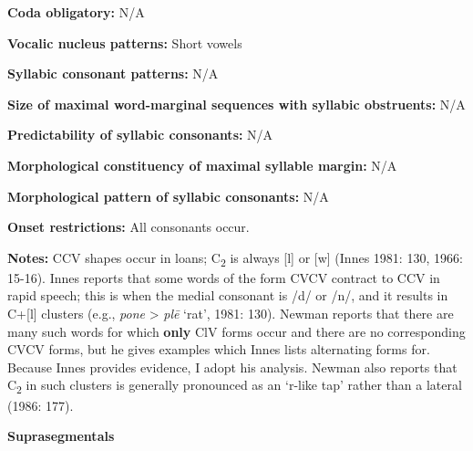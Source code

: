 \begin{styleBody}
\textbf{Coda obligatory:} N/A
\end{styleBody}

\begin{styleBody}
\textbf{Vocalic nucleus patterns:} Short vowels
\end{styleBody}

\begin{styleBody}
\textbf{Syllabic consonant patterns:} N/A
\end{styleBody}

\begin{styleBody}
\textbf{Size of maximal word{}-marginal sequences with syllabic obstruents:} N/A
\end{styleBody}

\begin{styleBody}
\textbf{Predictability of syllabic consonants:} N/A
\end{styleBody}

\begin{styleBody}
\textbf{Morphological constituency of maximal syllable margin:} N/A
\end{styleBody}

\begin{styleBody}
\textbf{Morphological pattern of syllabic consonants:} N/A
\end{styleBody}

\begin{styleBody}
\textbf{Onset restrictions: }All consonants occur.
\end{styleBody}

\begin{styleBody}
\textbf{Notes: }CCV shapes occur in loans; C\textsubscript{2} is always [l] or [w] (Innes 1981: 130, 1966: 15-16). Innes reports that some words of the form CVCV contract to CCV in rapid speech; this is when the medial consonant is /d/ or /n/, and it results in C+[l] clusters (e.g., \textit{pone} {\textgreater} \textit{pl\={e}} ‘rat’, 1981: 130). Newman reports that there are many such words for which \textbf{only} ClV forms occur and there are no corresponding CVCV forms, but he gives examples which Innes lists alternating forms for. Because Innes provides evidence, I adopt his analysis. Newman also reports that C\textsubscript{2} in such clusters is generally pronounced as an ‘r-like tap’ rather than a lateral (1986: 177).
\end{styleBody}

\begin{styleBody}
\textbf{Suprasegmentals}
\end{styleBody}

